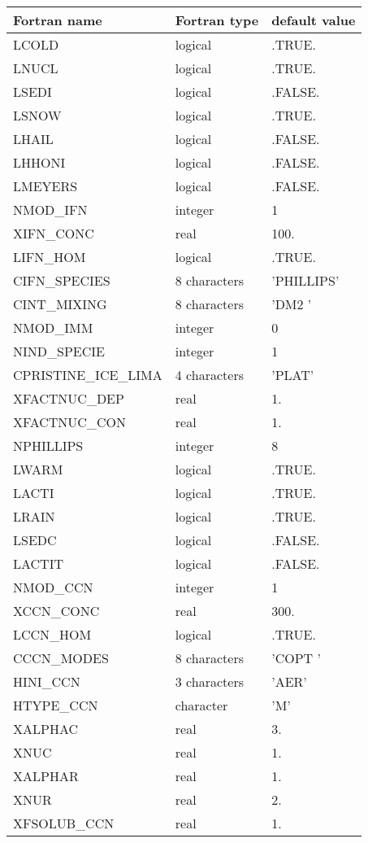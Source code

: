 \begin{center}
\begin{tabular} {|l|l|l|}
\hline
Fortran name & Fortran type & default value \\
\hline
LCOLD         &  logical     & .TRUE. \\
LNUCL & logical	  &  .TRUE. \\
LSEDI &  logical&  .FALSE. \\
LSNOW & logical  &  .TRUE.\\
LHAIL &  logical& .FALSE. \\
LHHONI & logical &  .FALSE.\\
LMEYERS & logical   & .FALSE. \\
NMOD\_IFN & integer   & 1  \\
XIFN\_CONC & real & 100.  \\
LIFN\_HOM & logical & .TRUE.  \\
CIFN\_SPECIES & 8 characters   & 'PHILLIPS' \\
CINT\_MIXING &8 characters  & 'DM2     ' \\
NMOD\_IMM & integer &0  \\
NIND\_SPECIE & integer & 1 \\
CPRISTINE\_ICE\_LIMA & 4 characters &  'PLAT' \\
XFACTNUC\_DEP & real  & 1. \\
XFACTNUC\_CON & real & 1. \\
NPHILLIPS & integer  & 8 \\
LWARM & logical  & .TRUE. \\
LACTI& logical  & .TRUE. \\
LRAIN& logical  & .TRUE. \\
LSEDC& logical  & .FALSE. \\
LACTIT& logical  & .FALSE. \\
NMOD\_CCN & integer   & 1  \\
XCCN\_CONC & real & 300.  \\
LCCN\_HOM & logical & .TRUE.  \\
CCCN\_MODES &  8 characters & 'COPT    '  \\
HINI\_CCN & 3 characters  & 'AER' \\
HTYPE\_CCN & character & 'M'  \\
XALPHAC & real & 3.  \\
XNUC & real  & 1.  \\
XALPHAR &  real& 1. \\
XNUR & real  & 2. \\
XFSOLUB\_CCN & real & 1.  \\

\end{tabular}
\end{center}
